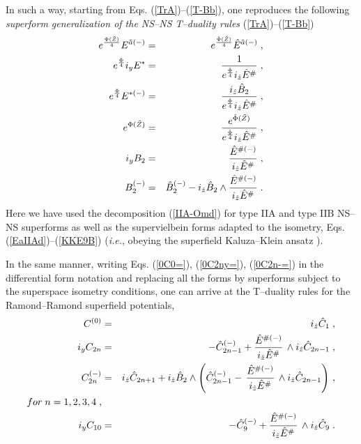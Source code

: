 \documentclass[a4paper,11pt]{article}
\begin{document}
In such a way, starting from Eqs. (\ref{TrA})--(\ref{T-Bb}), 
one reproduces 
the following {\sl superform generalization of the 
NS--NS T--duality rules}  (\ref{TrA})--(\ref{T-Bb})
\begin{eqnarray}\label{T-EIIII}
e^{{\Phi(\tilde{Z})\over 4}} E^{ {\tilde{a}}(-)} &=& 
e^{{\hat{\Phi}(\tilde{Z})\over 4}}\hat{E}^{ {\tilde{a}}(-)} \; , 
\\ \label{T-Eyz}
e^{{\Phi\over 4}} i_yE^{ {*}}&=& {1\over 
e^{{\hat{\Phi}\over 4}} i_{\hat{z}}\hat{E}^{ {\#}}}\; , 
\\  \label{T-Ey-}
e^{{\Phi\over 4}} E^{ {*}(-)}&=& {i_{\hat{z}} 
\hat{B}_2 \over e^{{\hat{\Phi}\over 4}} i_{\hat{z}}\hat{E}^{ {\#}}} \; , 
\\ \label{T-Phi}
e^{{\Phi}(\tilde{Z})} &=& {e^{\hat{\Phi}(\tilde{Z})}\over 
e^{{\hat{\Phi}\over 4}} i_{\hat{z}}\hat{E}^{ {\#}}} \; , 
\\  \label{T-By}
i_yB_2 &=& {\hat{E}^{ {\#}(-)}\over 
i_{\hat{z}}\hat{E}^{ {\#}}} \; , 
\\  \label{T-B-}
B_2^{(-)}&=& \hat{B}^{(-)}_2 - i_{\hat{z}}\hat{B}_2\wedge 
 {\hat{E}^{ {\#}(-)}\over i_{\hat{z}}\hat{E}^{ {\#}}} \; . 
\end{eqnarray}
Here we have used the decomposition (\ref{IIA-Omd}) 
for type IIA and type IIB NS--NS superforms as well as 
the supervielbein forms adapted to the isometry, Eqs. 
(\ref{EaIIAd})--(\ref{KKE9B}) ({\it i.e.}, 
obeying the superfield Kaluza--Klein ansatz \cite{ansatz}).  


In the same manner, writing Eqs. 
(\ref{0C0=}), (\ref{0C2ny=}), (\ref{0C2n-=}) in the 
differential form notation and replacing all the forms by superforms 
subject to the  superspace isometry conditions, 
one can arrive at the T--duality rules for 
the Ramond--Ramond superfield potentials, 
\begin{eqnarray}
\label{r0C=}
C^{(0)} &=&  i_{\hat{z}}\hat{C}_1 \; ,
\\ \label{r2nyC=}
i_{y}C_{2n}  &=& - \hat{C}^{(-)}_{2n-1} +
{\hat{E}^{ {\#}(-)}\over i_{\hat{z}}\hat{E}^{ {\#}}}\,\wedge
i_{\hat{z}} \hat{C}_{2n-1}\; , 
\\ \label{r2n-C=}
C^{(-)}_{2n}
&=& i_{\hat{z}}\hat{C}_{2n+1} +
i_{\hat{z}} \hat{B}_2 \wedge
\left(\hat{C}^{(-)}_{2n-1} -  \,
{\hat{E}^{ {\#}(-)}\over i_{\hat{z}}\hat{E}^{ {\#}}}\,
\wedge
i_{\hat{z}} \hat{C}_{2n-1} \right)\, , 
\\ 
\nonumber for \; n=1,2,3,4 \; , \\ 
\label{r10C=}
i_{y}C_{10}  &=& - \hat{C}^{(-)}_{9} +
{\hat{E}^{ {\#}(-)}\over i_{\hat{z}}\hat{E}^{ {\#}}}\,\wedge
i_{\hat{z}} \hat{C}_{9}\; .
\end{eqnarray}
\end{document}
